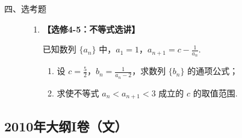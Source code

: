 \begin{description}

    \item[四、选考题]

    \begin{enumerate}[leftmargin=5pt]

      \addtocounter{enumi}{+21}

        \item \textbf{【选修4-5：不等式选讲】}

已知数列 \(\{a_{n}\}\) 中，\(a_1 = 1\)，\(a_{n+1} = c - \frac{1}{a_n}\).
\begin{enumerate}
\item 设 \(c = \frac{5}{2}\)，\(b_n = \frac{1}{a_n - 2}\)，求数列 \(\{b_n\}\) 的通项公式；
\item 求使不等式 \(a_{n} < a_{n+1} < 3\) 成立的 \(c\) 的取值范围.
\end{enumerate}

    \end{enumerate}

\end{description}


\subsection{2010年大纲I卷（文）}\label{gk:2010年大纲I卷（文）}

